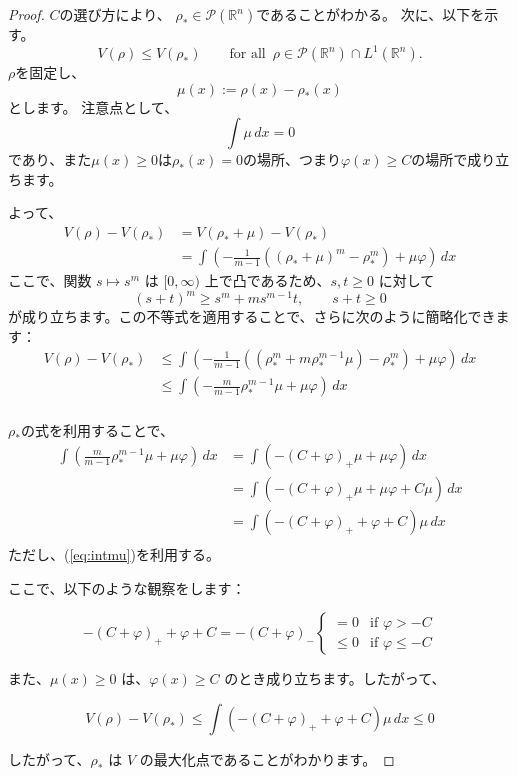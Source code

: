 \documentclass{jsarticle}
\theoremstyle{definition}
\begin{document}
\vspace\baselineskip 
\begin{proof}
  $C$の選び方により、 $\rho_* \in \mathcal{P}(\mathbb{R}^n)$であることがわかる。
  次に、以下を示す。
  $$
  V(\rho) \leq V(\rho_*) \qquad \text{for all } \, \rho \in \mathcal{P}(\mathbb{R}^n) \cap L^1(\mathbb{R}^n).
  $$
  $\rho$を固定し、 
  $$
  \mu(x) := \rho(x) - \rho_*(x)
  $$
  とします。
  注意点として、
  \begin{equation}
    \label{eq:intmu}
     \int \mu \, dx = 0
  \end{equation}
  であり、また$\mu(x) \geq 0$は$\rho_*(x) = 0$の場所、つまり$\varphi(x) \geq C$の場所で成り立ちます。

  よって、
  \begin{align*}
    V(\rho) - V(\rho_*) &= V(\rho_* + \mu) - V(\rho_*)\\
                        &= \int \left(- \frac{1}{m-1} ((\rho_* + \mu)^m - \rho_*^{m}) + \mu \varphi \right) \, dx
  \end{align*}
  ここで、関数 $s \mapsto s^m$ は $[0, \infty)$ 上で凸であるため、$s, t \geq 0$ に対して 
  $$
    (s + t)^m \geq s^m + ms^{m-1}t, \qquad s + t \geq 0
  $$ 
  が成り立ちます。この不等式を適用することで、さらに次のように簡略化できます：
  \begin{align*}
    V(\rho) - V(\rho_*) &\leq \int \left(- \frac{1}{m-1} ((\rho_*^m + m \rho_*^{m-1} \mu) - \rho_*^{m}) + \mu \varphi \right) \, dx\\
                        &\leq \int \left(- \frac{m}{m-1} \rho_*^{m-1}\mu + \mu\varphi\right) \, dx\\
  \end{align*}

  $\rho_*$の式を利用することで、
  \begin{align*}
    \int \left(\frac{m}{m-1} \rho_*^{m-1}\mu + \mu\varphi\right) \, dx &= \int \left(-(C + \varphi)_+ \mu + \mu\varphi\right) \, dx \\
                                                                       &= \int \left(-(C + \varphi)_+ \mu + \mu \varphi + C \mu\right) \, dx \\
                                                                       &= \int \left(-(C + \varphi)_+ + \varphi + C\right)\mu \, dx \\  
  \end{align*}
  ただし、(\ref{eq:intmu})を利用する。

  ここで、以下のような観察をします：

  \[
    - (C + \varphi)_+ + \varphi + C = - (C + \varphi)_- \begin{cases} = 0 & \text{if } \varphi > - C \\ 
                                                                  \leq 0 & \text{if } \varphi \leq - C \end{cases}
  \]

  また、\(\mu(x) \geq 0\) は、\(\varphi(x) \geq C\) のとき成り立ちます。したがって、

  \[
     V(\rho) - V(\rho_*) \leq \int (- (C + \varphi)_+ + \varphi + C) \mu \, dx \leq 0
  \]

  したがって、\(\rho_*\) は \(V\) の最大化点であることがわかります。
\end{proof}
\end{document}
